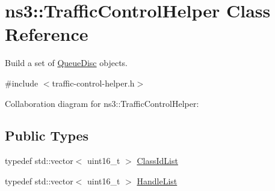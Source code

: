 \hypertarget{classns3_1_1TrafficControlHelper}{}\section{ns3\+:\+:Traffic\+Control\+Helper Class Reference}
\label{classns3_1_1TrafficControlHelper}


Build a set of \hyperlink{classns3_1_1QueueDisc}{Queue\+Disc} objects.  




{\ttfamily \#include $<$traffic-\/control-\/helper.\+h$>$}



Collaboration diagram for ns3\+:\+:Traffic\+Control\+Helper\+:
\subsection*{Public Types}
\begin{DoxyCompactItemize}
\item 
typedef std\+::vector$<$ uint16\+\_\+t $>$ \hyperlink{classns3_1_1TrafficControlHelper_aa42018a8e7faa9b7d1d4d2320014ef56}{Class\+Id\+List}
\item 
typedef std\+::vector$<$ uint16\+\_\+t $>$ \hyperlink{classns3_1_1TrafficControlHelper_a0077f89ad2e6f94f6f108eca4f3a8534}{Handle\+List}
\end{DoxyCompactItemize}
